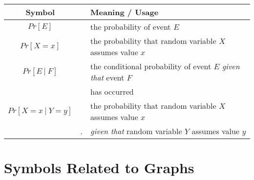 \begin{tabular}{c|cl}
{\bf Symbol} & & {\bf Meaning} / {\bf Usage} \\ \hline
\hline
$Pr[E]$
  & & the probability of event $E$ \\ \hline
$Pr[X=x]$
  & & the probability that random variable $X$ assumes value $x$ \\ \hline
$Pr[E \ | \ F]$
  &  & the conditional probability of event $E$ {\em given that} event $F$ \\
  &  & has occurred \\ \hline
$Pr[X=x \ | \ Y=y]$
  & & the probability that random variable $X$ assumes value $x$ \\
  &. & {\em given that} random variable $Y$ assumes value $y$ \\ \hline
\end{tabular}


\section*{Symbols Related to Graphs}
